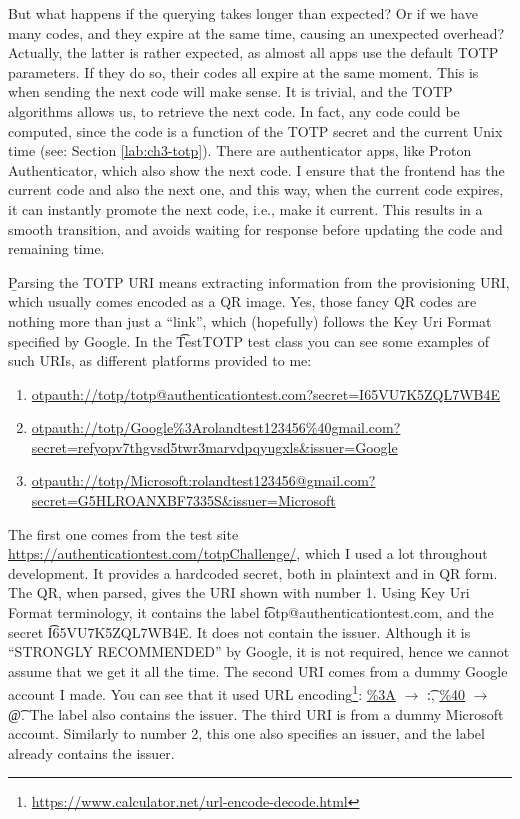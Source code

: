 But what happens if the querying takes longer than expected?
Or if we have many codes, and they expire at the same time, causing an unexpected overhead?
Actually, the latter is rather expected, as almost all apps use the default TOTP parameters.
If they do so, their codes all expire at the same moment.
This is when sending the next code will make sense.
It is trivial, and the TOTP algorithms allows us, to retrieve the next code.
In fact, any code could be computed, since the code is a function of the TOTP secret and the current Unix time (see: Section \ref{lab:ch3-totp}).
There are authenticator apps, like Proton Authenticator, which also show the next code.
I ensure that the frontend has the current code and also the next one, and this way, when the current code expires, it can instantly \b{promote} the next code, i.e., make it current.
This results in a smooth transition, and avoids waiting for response before updating the code and remaining time.

\b{Parsing the TOTP URI} means extracting information from the provisioning URI, which usually comes encoded as a QR image.
Yes, those fancy QR codes are nothing more than just a ``link'', which (hopefully) follows the Key Uri Format specified by Google\cite{key-uri-format}.
In the \t{TestTOTP} test class you can see some examples of such URIs, as different platforms provided to me:

\begin{enumerate}
  \item \url{otpauth://totp/totp@authenticationtest.com?secret=I65VU7K5ZQL7WB4E}
  \item \url{otpauth://totp/Google\%3Arolandtest123456\%40gmail.com?secret=refyopv7thgvsd5twr3marvdpqyugxls\&issuer=Google}
  \item \url{otpauth://totp/Microsoft:rolandtest123456@gmail.com?secret=G5HLROANXBF7335S\&issuer=Microsoft}
\end{enumerate}

The first one comes from the test site \url{https://authenticationtest.com/totpChallenge/}, which I used a lot throughout development.
It provides a hardcoded secret, both in plaintext and in QR form.
The QR, when parsed, gives the URI shown with number 1.
Using Key Uri Format terminology, it contains the label \t{totp@authenticationtest.com}, and the secret \t{I65VU7K5ZQL7WB4E}.
It does not contain the issuer.
Although it is ``STRONGLY RECOMMENDED'' by Google, it is not required, hence we cannot assume that we get it all the time.
The second URI comes from a dummy Google account I made.
You can see that it used URL encoding\footnote{\url{https://www.calculator.net/url-encode-decode.html}}: \url{\%3A} $\rightarrow$ \t{:}, \url{\%40} $\rightarrow$ \t{@}.
The label also contains the issuer.
The third URI is from a dummy Microsoft account.
Similarly to number 2, this one also specifies an issuer, and the label already contains the issuer.

